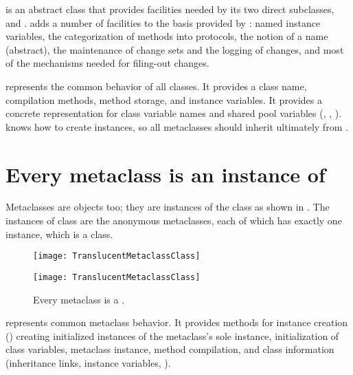 \documentclass[a4paper,10pt,twoside]{book}
\begin{document}
 is an abstract class that provides facilities needed by its two direct subclasses,  and .
 adds a number of facilities to the basis provided by :
named instance variables,
the categorization of methods into protocols,
the notion of a name (abstract),
the maintenance of change sets and the logging of changes, and
most of the mechanisms needed for filing-out changes.

 represents the common behavior of all classes.
It provides a class name, compilation methods, method storage, and instance variables.
It provides a concrete representation for class variable names and shared pool variables (, , ).
 knows how to create instances, so all metaclasses should inherit ultimately from .

\section{Every metaclass is an instance of }

Metaclasses are objects too; they are instances of the class  as shown in .
The instances of class  are the anonymous metaclasses, each of which has exactly one instance, which is a class.

\begin{center}
\begin{figure}
\ifluluelse
	{\centerline{\texttt{[image: TranslucentMetaclassClass]}}}
	{\centerline{\texttt{[image: TranslucentMetaclassClass]}}}
\caption{Every metaclass is a .\label{fig:metaclassclass}}
\end{figure}
\end{center}

 represents common metaclass behavior.
It provides methods for instance creation () creating initialized instances of the metaclass's sole instance, initialization of class variables, metaclass instance,
method compilation, %
and class information (inheritance links, instance variables, \etc).
\end{document}
